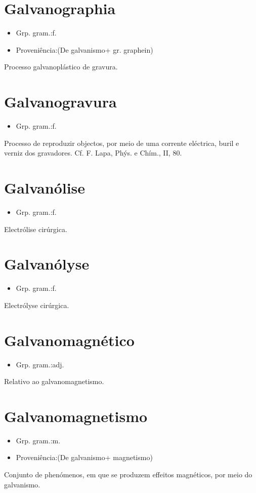 \section{Galvanographia}
\begin{itemize}
\item {Grp. gram.:f.}
\end{itemize}
\begin{itemize}
\item {Proveniência:(De \textunderscore galvanismo\textunderscore  + gr. \textunderscore graphein\textunderscore )}
\end{itemize}
Processo galvanoplástico de gravura.
\section{Galvanogravura}
\begin{itemize}
\item {Grp. gram.:f.}
\end{itemize}
Processo de reproduzir objectos, por meio de uma corrente eléctrica, buril e verniz dos gravadores. Cf. F. Lapa, \textunderscore Phýs. e Chím.\textunderscore , II, 80.
\section{Galvanólise}
\begin{itemize}
\item {Grp. gram.:f.}
\end{itemize}
Electrólise cirúrgica.
\section{Galvanólyse}
\begin{itemize}
\item {Grp. gram.:f.}
\end{itemize}
Electrólyse cirúrgica.
\section{Galvanomagnético}
\begin{itemize}
\item {Grp. gram.:adj.}
\end{itemize}
Relativo ao galvanomagnetismo.
\section{Galvanomagnetismo}
\begin{itemize}
\item {Grp. gram.:m.}
\end{itemize}
\begin{itemize}
\item {Proveniência:(De \textunderscore galvanismo\textunderscore  + \textunderscore magnetismo\textunderscore )}
\end{itemize}
Conjunto de phenómenos, em que se produzem effeitos magnéticos, por meio do galvanismo.
